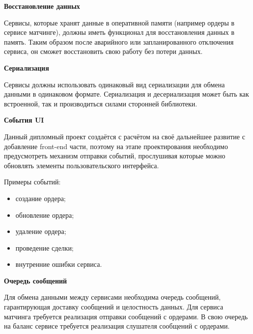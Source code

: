 \textbf{Восстановление данных}

Сервисы, которые хранят данные в оперативной памяти (например ордеры в сервисе матчинге), должны иметь функционал для восстановления данных в память. Таким образом после аварийного или запланированного отключения сервиса, он сможет восстановить свою работу без потери данных.

\textbf{Сериализация}

Сервисы должны использовать одинаковый вид сериализации для обмена данными в одинаковом формате. Сериализация и десериализация может быть как встроенной, так и производиться силами сторонней библиотеки.

\textbf{События UI}

Данный дипломный проект создаётся с расчётом на своё дальнейшее развитие с добавление front-end части, поэтому на этапе проектирования необходимо предусмотреть механизм отправки событий, прослушивая которые можно обновлять элементы пользовательского интерфейса.

Примеры событий:
\begin{itemize}
    \item создание ордера;
    \item обновление ордера;
    \item удаление ордера;
    \item проведение сделки;
    \item внутренние ошибки сервиса.
\end{itemize}

\textbf{Очередь сообщений}

Для обмена данными между сервисами необходима очередь сообщений, гарантирующая доставку сообщений и целостность данных. Для сервиса матчинга требуется реализация отправки сообщений с ордерами. В свою очередь на баланс сервисе требуется реализация слушателя сообщений с ордерами.

